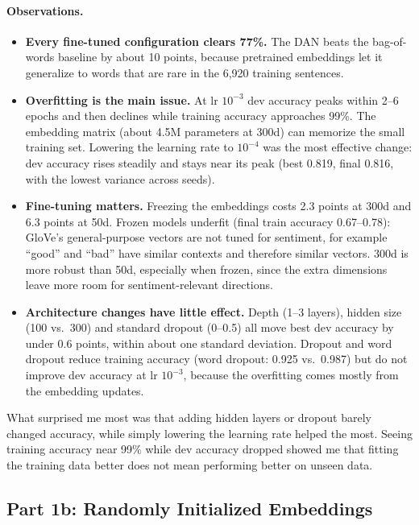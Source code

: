 \documentclass[10pt]{article}
\begin{document}
\paragraph{Observations.}
\begin{itemize}
  \item \textbf{Every fine-tuned configuration clears 77\%.} The DAN beats the bag-of-words baseline by about 10
        points, because pretrained embeddings let it generalize to words that are rare in the 6,920 training
        sentences.
  \item \textbf{Overfitting is the main issue.} At lr $10^{-3}$ dev accuracy peaks within 2--6 epochs and then
        declines while training accuracy approaches 99\%. The embedding matrix (about 4.5M parameters at 300d) can
        memorize the small training set. Lowering the learning rate to $10^{-4}$ was the most effective change: dev
        accuracy rises steadily and stays near its peak (best 0.819, final 0.816, with the lowest variance across
        seeds).
  \item \textbf{Fine-tuning matters.} Freezing the embeddings costs 2.3 points at 300d and 6.3 points at 50d.
        Frozen models underfit (final train accuracy 0.67--0.78): GloVe's general-purpose vectors are not tuned for
        sentiment, for example ``good'' and ``bad'' have similar contexts and therefore similar vectors. 300d is more
        robust than 50d, especially when frozen, since the extra dimensions leave more room for sentiment-relevant
        directions.
  \item \textbf{Architecture changes have little effect.} Depth (1--3 layers), hidden size (100 vs.\ 300) and
        standard dropout (0--0.5) all move best dev accuracy by under 0.6 points, within about one standard
        deviation. Dropout and word dropout reduce training accuracy (word dropout: 0.925 vs.\ 0.987) but do not
        improve dev accuracy at lr $10^{-3}$, because the overfitting comes mostly from the embedding updates.
\end{itemize}

What surprised me most was that adding hidden layers or dropout barely changed accuracy, while simply lowering the
learning rate helped the most. Seeing training accuracy near 99\% while dev accuracy dropped showed me that fitting
the training data better does not mean performing better on unseen data.

\subsection{Part 1b: Randomly Initialized Embeddings}
\end{document}
